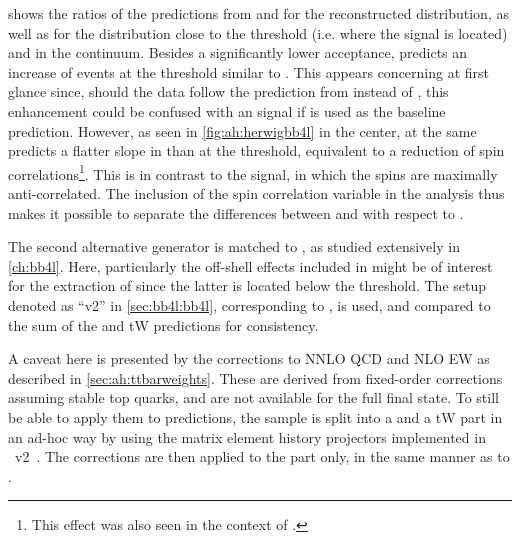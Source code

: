  shows the ratios of the predictions from \herwig and \pythia for the reconstructed \mtt distribution, as well as for the \chel distribution close to the \ttbar threshold (i.e. where the \etat signal is located) and in the \ttbar continuum. Besides a significantly lower \ttbar acceptance, \herwig predicts an increase of events at the \ttbar threshold similar to \etat.
This appears concerning at first glance since, should the data follow the prediction from \herwig instead of \pythia, this enhancement could be confused with an \etat signal if \pythia is used as the baseline prediction.
However, as seen in \cref{fig:ah:herwigbb4l} in the center, \herwig at the same predicts a flatter slope in \chel than \pythia at the \ttbar threshold, equivalent to a reduction of \ttbar spin correlations\footnote{This effect was also seen in the context of .}. This is in contrast to the \etat signal, in which the \ttbar spins are maximally anti-correlated. The inclusion of the spin correlation variable \chel in the analysis thus makes it possible to separate the differences between \powheg and \herwig with respect to \etat.

The second alternative generator is \bbfourl matched to \pythia, as studied extensively in \cref{ch:bb4l}. Here, particularly the off-shell effects included in \bbfourl might be of interest for the extraction of \etat since the latter is located below the \ttbar threshold. The setup denoted as ``\bbfourl v2'' in \cref{sec:bb4l:bb4l}, corresponding to , is used, and compared to the sum of the \powheg \hvq \ttbar and tW predictions for consistency.

A caveat here is presented by the corrections to NNLO QCD and NLO EW as described in \cref{sec:ah:ttbarweights}. These are derived from fixed-order corrections assuming stable top quarks, and are not available for the full \bbllnunu final state. To still be able to apply them to \bbfourl predictions, the \bbfourl sample is split into a \ttbar and a tW part in an ad-hoc way by using the matrix element history projectors implemented in \bbfourl~v2~\cite{Jezo:2023rht}. The corrections are then applied to the \ttbar part only, in the same manner as to \powheg \hvq.


